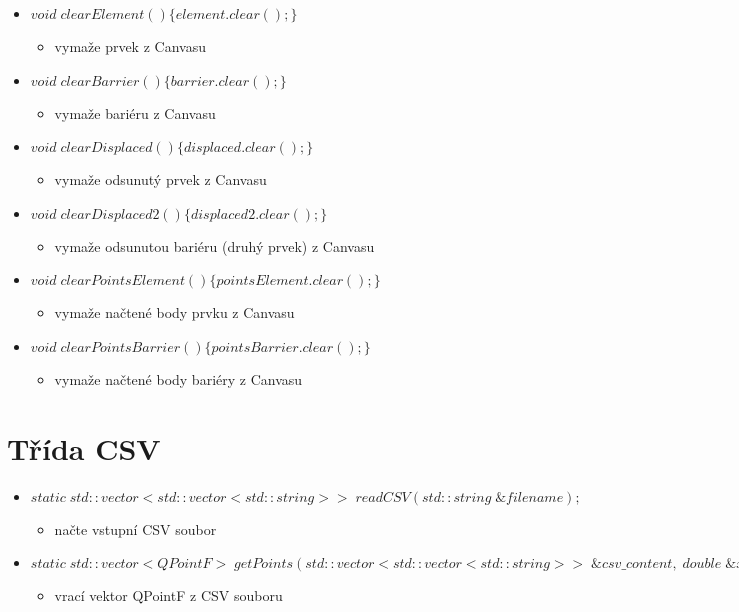 \documentclass[oneside,12pt,a4paper]{book}
\begin{document}
\begin{itemize}
    \item $void\; clearElement()\{element.clear();\}$
    \begin{itemize}
    \item  vymaže prvek z Canvasu
    \end{itemize}

    \item $void\; clearBarrier()\{barrier.clear();\}$
    \begin{itemize}
    \item  vymaže bariéru z Canvasu
    \end{itemize}

    \item $void\; clearDisplaced()\{displaced.clear();\}$
    \begin{itemize}
    \item  vymaže odsunutý prvek z Canvasu
    \end{itemize}

    \item $void\; clearDisplaced2()\{displaced2.clear();\}$
    \begin{itemize}
    \item  vymaže odsunutou bariéru (druhý prvek) z Canvasu
    \end{itemize}

    \item $void\; clearPointsElement()\{pointsElement.clear();\}$
    \begin{itemize}
    \item  vymaže načtené body prvku z Canvasu
    \end{itemize}

    \item $void\; clearPointsBarrier()\{pointsBarrier.clear();\}$
    \begin{itemize}
    \item  vymaže načtené body bariéry z Canvasu
    \end{itemize}

\end{itemize}

   \section{Třída CSV}
   \begin{itemize}
    \item $static\; std::vector<std::vector<std::string>>\; readCSV(std::string\; \&filename);$
    \begin{itemize}
\item načte vstupní CSV soubor
\end{itemize}
\item $static\; std::vector<QPointF>\; getPoints(std::vector<std::vector<std::string>>\; \&csv\_content,\; double\; \&x\_min,\; double\; \&x\_max,\; double\; \&y\_min,\; double\; \&y\_max);$
\begin{itemize}
\item vrací vektor QPointF z CSV souboru
\end{itemize}
\end{itemize}
\end{document}
